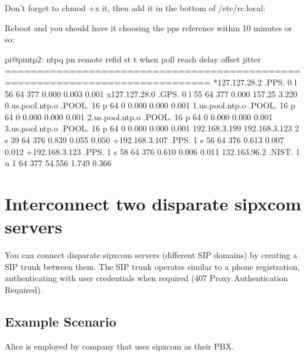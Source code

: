 \documentclass[letterpaper,10pt,english]{sphinxmanual}
\begin{document}
Don’t forget to chmod +x it, then add it in the bottom of /etc/rc.local:

\begin{sphinxVerbatim}[commandchars=\\\{\}]
 
\end{sphinxVerbatim}

Reboot and you should have it choosing the pps reference within 10 minutes or so:

\begin{sphinxVerbatim}[commandchars=\\\{\}]
pi@pi\PYGZhy{}ntp2:\PYGZti{} \PYGZdl{} ntpq \PYGZhy{}pn
     remote           refid      st t when poll reach   delay   offset  jitter
==============================================================================
*127.127.28.2    .PPS.            0 l   56   64  377    0.000   \PYGZhy{}0.003   0.001
x127.127.28.0    .GPS.            0 l   55   64  377    0.000  \PYGZhy{}157.25   3.220
 0.us.pool.ntp.o .POOL.          16 p    \PYGZhy{}   64    0    0.000    0.000   0.001
 1.us.pool.ntp.o .POOL.          16 p    \PYGZhy{}   64    0    0.000    0.000   0.001
 2.us.pool.ntp.o .POOL.          16 p    \PYGZhy{}   64    0    0.000    0.000   0.001
 3.us.pool.ntp.o .POOL.          16 p    \PYGZhy{}   64    0    0.000    0.000   0.001
\PYGZhy{}192.168.3.199   192.168.3.123    2 s   39   64  376    0.839    0.055   0.050
+192.168.3.107   .PPS.            1 s   56   64  376    0.613   \PYGZhy{}0.007   0.012
+192.168.3.123   .PPS.            1 s   58   64  376    0.610   \PYGZhy{}0.006   0.011
\PYGZhy{}132.163.96.2    .NIST.           1 u    1   64  377   54.556    1.749   0.366
\end{sphinxVerbatim}


\section{Interconnect two disparate sipxcom servers}
\label{\detokenize{howto:interconnect-two-disparate-sipxcom-servers}}
You can connect disparate sipxcom servers (different SIP domains) by creating a SIP trunk between them.
The SIP trunk operates similar to a phone registration, authenticating with user credentials when required (407 Proxy Authentication Required).


\subsection{Example Scenario}
\label{\detokenize{howto:example-scenario}}
Alice is employed by company that uses sipxcom as their PBX.
\end{document}
